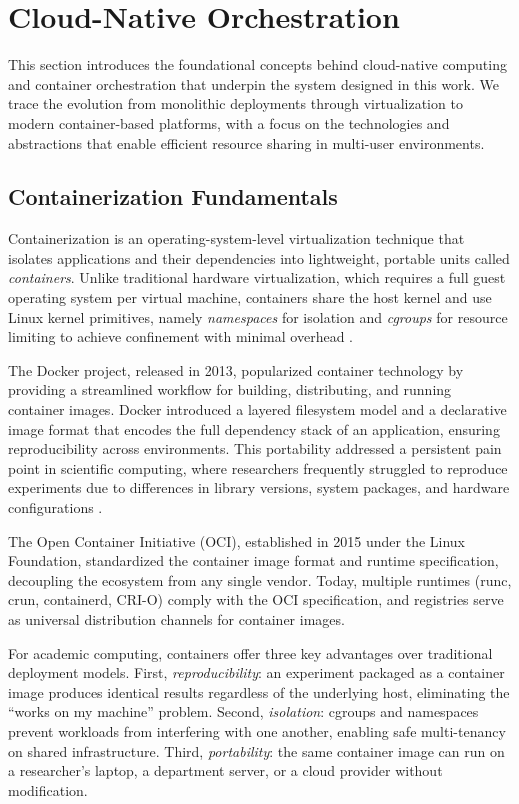 \section{Cloud-Native Orchestration}
\label{sec:cloud-native}

This section introduces the foundational concepts behind cloud-native computing and container orchestration that underpin the system designed in this work. We trace the evolution from monolithic deployments through virtualization to modern container-based platforms, with a focus on the technologies and abstractions that enable efficient resource sharing in multi-user environments.

\subsection{Containerization Fundamentals}

Containerization is an operating-system-level virtualization technique that isolates applications and their dependencies into lightweight, portable units called \emph{containers}. Unlike traditional hardware virtualization, which requires a full guest operating system per virtual machine, containers share the host kernel and use Linux kernel primitives, namely \emph{namespaces} for isolation and \emph{cgroups} for resource limiting to achieve confinement with minimal overhead \citep{sultan2019container}.

The Docker project, released in 2013, popularized container technology by providing a streamlined workflow for building, distributing, and running container images. Docker introduced a layered filesystem model and a declarative image format that encodes the full dependency stack of an application, ensuring reproducibility across environments. This portability addressed a persistent pain point in scientific computing, where researchers frequently struggled to reproduce experiments due to differences in library versions, system packages, and hardware configurations \citep{domingus2022cloud}.

The Open Container Initiative (OCI), established in 2015 under the Linux Foundation, standardized the container image format and runtime specification, decoupling the ecosystem from any single vendor. Today, multiple runtimes (runc, crun, containerd, CRI-O) comply with the OCI specification, and registries serve as universal distribution channels for container images.

For academic computing, containers offer three key advantages over traditional deployment models. First, \emph{reproducibility}: an experiment packaged as a container image produces identical results regardless of the underlying host, eliminating the ``works on my machine'' problem. Second, \emph{isolation}: cgroups and namespaces prevent workloads from interfering with one another, enabling safe multi-tenancy on shared infrastructure. Third, \emph{portability}: the same container image can run on a researcher's laptop, a department server, or a cloud provider without modification.

